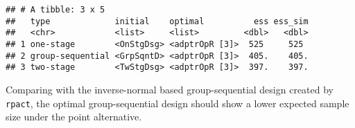\documentclass[
]{book}
\newenvironment{Shaded}{\begin{snugshade}}{\end{snugshade}}
\newcommand{\CommentTok}[1]{\textcolor[rgb]{0.56,0.35,0.01}{\textit{#1}}}
\newcommand{\DataTypeTok}[1]{\textcolor[rgb]{0.13,0.29,0.53}{#1}}
\newcommand{\DecValTok}[1]{\textcolor[rgb]{0.00,0.00,0.81}{#1}}
\newcommand{\FloatTok}[1]{\textcolor[rgb]{0.00,0.00,0.81}{#1}}
\newcommand{\KeywordTok}[1]{\textcolor[rgb]{0.13,0.29,0.53}{\textbf{#1}}}
\newcommand{\NormalTok}[1]{#1}
\newcommand{\OperatorTok}[1]{\textcolor[rgb]{0.81,0.36,0.00}{\textbf{#1}}}
\newcommand{\StringTok}[1]{\textcolor[rgb]{0.31,0.60,0.02}{#1}}
\begin{document}
\begin{Shaded}
\end{Shaded}

\begin{verbatim}
## # A tibble: 3 x 5
##   type             initial    optimal          ess ess_sim
##   <chr>            <list>     <list>         <dbl>   <dbl>
## 1 one-stage        <OnStgDsg> <adptrOpR [3]>  525     525 
## 2 group-sequential <GrpSqntD> <adptrOpR [3]>  405.    405.
## 3 two-stage        <TwStgDsg> <adptrOpR [3]>  397.    397.
\end{verbatim}

Comparing with the inverse-normal based group-sequential design created
by \texttt{rpact}, the optimal group-sequential design should show
a lower expected sample size under the point alternative.
\end{document}
